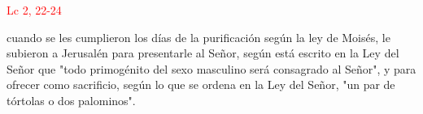 \hfill\textcolor{red}{Lc 2, 22-24}

 cuando se les cumplieron los días de la purificación según la ley de Moisés, le subieron a Jerusalén para presentarle al Señor,
según está escrito en la Ley del Señor que "todo primogénito del sexo masculino será consagrado al Señor", y para ofrecer como sacrificio,
según lo que se ordena en la Ley del Señor, "un par de tórtolas o dos palominos".